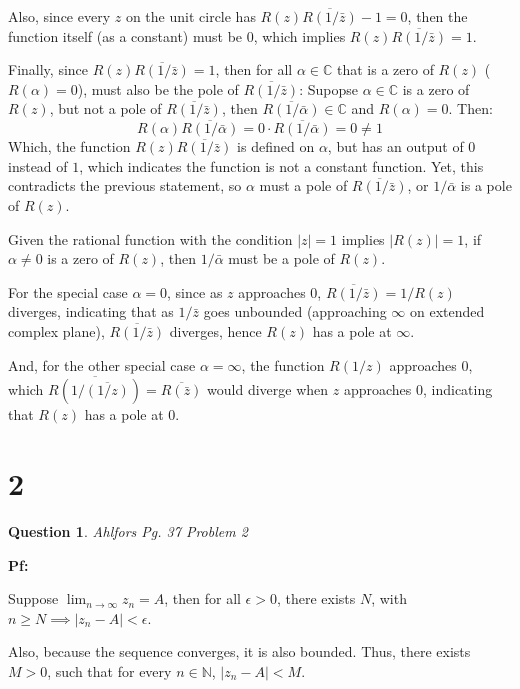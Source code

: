 \documentclass{article}
\newtheorem{question}{Question}
\begin{document}
Also, since every $z$ on the unit circle has $R(z)\overline{R(1/\bar{z})}-1=0$, then the function itself (as a constant) must be $0$, which implies $R(z)\overline{R(1/\bar{z})}=1$.

\hfill

Finally, since $R(z)\overline{R(1/\bar{z})}=1$, then for all $\alpha\in\mathbb{C}$ that is a zero of $R(z)$ ($R(\alpha)=0$), must also be the pole of $\overline{R(1/\bar{z})}$:
Supopse $\alpha\in\mathbb{C}$ is a zero of $R(z)$, but not a pole of $\overline{R(1/\bar{z})}$, then $\overline{R(1/\bar{\alpha})}\in\mathbb{C}$ and $R(\alpha)=0$. Then:
$$R(\alpha)\overline{R(1/\bar{\alpha})}=0\cdot\overline{R(1/\bar{\alpha})} = 0 \neq 1$$
Which, the function $R(z)\overline{R(1/\bar{z})}$ is defined on $\alpha$, but has an output of $0$ instead of $1$, which indicates the function is not a constant function.
Yet, this contradicts the previous statement, so $\alpha$ must a pole of $\overline{R(1/\bar{z})}$, or $1/\bar{\alpha}$ is a pole of $R(z)$.

\hfill

Given the rational function with the condition $|z|=1$ implies $|R(z)|=1$, if $\alpha\neq 0$ is a zero of $R(z)$, then $1/\bar{\alpha}$ must be a pole of $R(z)$.

For the special case $\alpha=0$, since as $z$ approaches $0$, $\overline{R(1/\bar{z})}=1/R(z)$ diverges, indicating that as $1/\bar{z}$ goes unbounded (approaching $\infty$ on extended complex plane),
$\overline{R(1/\bar{z})}$ diverges, hence $R(z)$ has a pole at $\infty$.

And, for the other special case $\alpha=\infty$, the function $R(1/z)$ approaches $0$,
which $\overline{R(1/\overline{(1/z)})} = \overline{R(\bar{z})}$ would diverge when $z$ approaches $0$, indicating that $R(z)$ has a pole at $0$.

\break

\section*{2}
\begin{question}
    Ahlfors Pg. 37 Problem 2
\end{question}

\textbf{Pf:}

Suppose $\lim_{n\rightarrow\infty}z_n=A$, then for all $\epsilon>0$, there exists $N$, with $n\geq N\implies |z_n-A|<\epsilon$.

Also, because the sequence converges, it is also bounded. Thus, there exists $M>0$, such that for every $n\in\mathbb{N}$, $|z_n-A|<M$.
\end{document}
